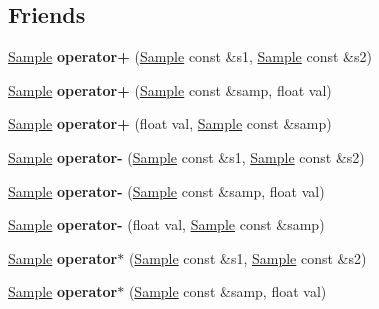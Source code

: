 \subsection*{Friends}
\begin{DoxyCompactItemize}
\item 
\hypertarget{class_sample_a2fd9547bca678d483b7678ff2d19c7bf}{\hyperlink{class_sample}{Sample} {\bfseries operator+} (\hyperlink{class_sample}{Sample} const \&s1, \hyperlink{class_sample}{Sample} const \&s2)}\label{class_sample_a2fd9547bca678d483b7678ff2d19c7bf}

\item 
\hypertarget{class_sample_a001ec49a9676fe37d9dfbb6f0b27127d}{\hyperlink{class_sample}{Sample} {\bfseries operator+} (\hyperlink{class_sample}{Sample} const \&samp, float val)}\label{class_sample_a001ec49a9676fe37d9dfbb6f0b27127d}

\item 
\hypertarget{class_sample_a9a5ae50b9096d1c778d6a676b562e11a}{\hyperlink{class_sample}{Sample} {\bfseries operator+} (float val, \hyperlink{class_sample}{Sample} const \&samp)}\label{class_sample_a9a5ae50b9096d1c778d6a676b562e11a}

\item 
\hypertarget{class_sample_a4539e34cec889979677229c5ddf6eaf1}{\hyperlink{class_sample}{Sample} {\bfseries operator-\/} (\hyperlink{class_sample}{Sample} const \&s1, \hyperlink{class_sample}{Sample} const \&s2)}\label{class_sample_a4539e34cec889979677229c5ddf6eaf1}

\item 
\hypertarget{class_sample_a30c04ca57e9f947cdd68041231676acc}{\hyperlink{class_sample}{Sample} {\bfseries operator-\/} (\hyperlink{class_sample}{Sample} const \&samp, float val)}\label{class_sample_a30c04ca57e9f947cdd68041231676acc}

\item 
\hypertarget{class_sample_a27b97bc41eae03efe5f4157bdc3e42b2}{\hyperlink{class_sample}{Sample} {\bfseries operator-\/} (float val, \hyperlink{class_sample}{Sample} const \&samp)}\label{class_sample_a27b97bc41eae03efe5f4157bdc3e42b2}

\item 
\hypertarget{class_sample_ae6e21a0672b773c8ae0537410c48a385}{\hyperlink{class_sample}{Sample} {\bfseries operator$\ast$} (\hyperlink{class_sample}{Sample} const \&s1, \hyperlink{class_sample}{Sample} const \&s2)}\label{class_sample_ae6e21a0672b773c8ae0537410c48a385}

\item 
\hypertarget{class_sample_a6c56eccda9469f7283e67c6e89b05239}{\hyperlink{class_sample}{Sample} {\bfseries operator$\ast$} (\hyperlink{class_sample}{Sample} const \&samp, float val)}\label{class_sample_a6c56eccda9469f7283e67c6e89b05239}


\end{DoxyCompactItemize}

